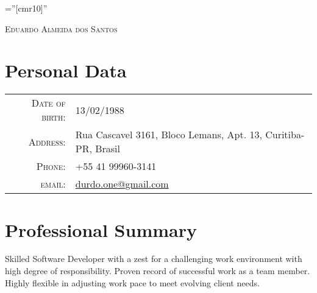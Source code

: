 \documentclass[a4paper,10pt]{article}
\begin{document}
\pagestyle{empty} %

\font\fb=''[cmr10]'' %


\par{\centering
        {\Huge \textsc{Eduardo Almeida dos Santos}
    }\bigskip\par}


\section{Personal Data}

\begin{tabular}{rl}
    \textsc{Date of birth:}
    & 13/02/1988 \\

    \textsc{Address:}
    & Rua Cascavel 3161, Bloco Lemans, Apt. 13, Curitiba-PR, Brasil \\

    \textsc{Phone:}
    & +55 41 99960-3141 \\

    \textsc{email:}
    & \href{mailto:durdo.one@gmail.com}{durdo.one@gmail.com}
\end{tabular}


\section{Professional Summary}
    Skilled Software Developer with a zest for a challenging work environment
    with high degree of responsibility. Proven record of successful work as a
    team member. Highly flexible in adjusting work pace to meet evolving client
    needs.

\end{document}

